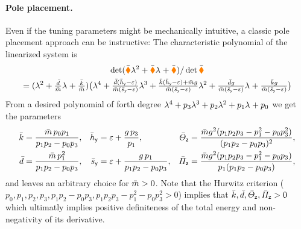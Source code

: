 \paragraph{Pole placement.}
Even if the tuning parameters might be mechanically intuitive, a classic pole placement approach can be instructive:
The characteristic polynomial of the linearized system is
\begin{multline}
 \det(\bar{\boldsymbol{\textcolor{orange}{\blacklozenge}}} \lambda_{}^2 + \bar{\boldsymbol{\textcolor{orange}{\blacklozenge}}} \lambda_{} + \bar{\boldsymbol{\textcolor{orange}{\blacklozenge}}}) / \det\bar{\boldsymbol{\textcolor{orange}{\blacklozenge}}}
\\
 = (\lambda_{}^2 + \tfrac{\bar{d}}{\bar{m}} \lambda_{} + \tfrac{\bar{k}}{\bar{m}})
 \big(\lambda_{}^4
 + \tfrac{\bar{d}(\bar{h}_{\mathsf{y}}-\varepsilon)}{\bar{m}(\bar{s}_{\mathsf{y}}-\varepsilon)} \lambda_{}^3
 + \tfrac{\bar{k}(\bar{h}_{\mathsf{y}}-\varepsilon) + \bar{m} g}{\bar{m}(\bar{s}_{\mathsf{y}}-\varepsilon)} \lambda_{}^2
 + \tfrac{\bar{d} g}{\bar{m} (\bar{s}_{\mathsf{y}}-\varepsilon)} \lambda_{}
 + \tfrac{\bar{k} g}{\bar{m} (\bar{s}_{\mathsf{y}}-\varepsilon)} \big)
\end{multline}
From a desired polynomial of forth degree $\lambda_{}^4 + p_3 \lambda_{}^3 + p_2 \lambda_{}^2 + p_1 \lambda_{} + p_0$ we get the parameters
\begin{align}
 \bar{k} &= \frac{\bar{m} \, p_0 p_1}{p_1 p_2 - p_0 p_3},&
 \bar{h}_{\mathsf{y}} &= \varepsilon + \frac{g\, p_3}{p_1},&
 \bar{\varTheta}_{\mathsf{z}} &= \frac{\bar{m} g^2 (p_1 p_2 p_3 - p_1^2 - p_0 p_3^2)}{(p_1 p_2 - p_0 p_3)^2},
\\
 \bar{d} &= \frac{\bar{m}\, p_1^2}{p_1 p_2 - p_0 p_3},&
 \bar{s}_{\mathsf{y}} &= \varepsilon + \frac{g\, p_1}{p_1 p_2 - p_0 p_3},&
 \bar{\varPi}_{\mathsf{z}} &= \frac{\bar{m} g^2 (p_1 p_2 p_3 - p_1^2 - p_0 p_3)}{p_1 (p_1 p_2 - p_0 p_3)}, 
\end{align}
and leaves an arbitrary choice for $\bar{m} > 0$.
Note that the Hurwitz criterion ($p_0, p_1, p_2, p_3, p_1 p_2 - p_0 p_3, p_1 p_2 p_3 - p_1^2 - p_0 p_3^2 > 0$) implies that $\bar{k}, \bar{d}, \bar{\varTheta}_{\mathsf{z}}, \bar{\varPi}_{\mathsf{z}} > 0$ which ultimatly implies positive definiteness of the total energy and non-negativity of its derivative.

